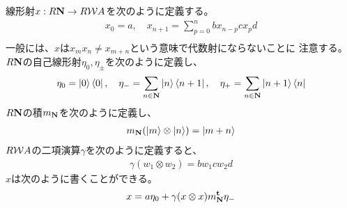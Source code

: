{	\begin{note}[構造その一]\label{note:構造その一} %
		線形射$x:R\mathbf{N}\to R{{\mathcal{W}}} A$を次のように定義する。
		\begin{equation*}\begin{split}
				x_0 = a,\quad x_{n+1} = \sum_{p=0}^n bx_{n-p}cx_pd \\
		\end{split}\end{equation*}
		一般には、$x$は$x_mx_n\neq x_{m+n}$という意味で代数射にならないことに
		注意する。$R\mathbf{N}$の自己線形射$\eta_0,\eta_\pm$を次のように定義し、
		\begin{equation*}\begin{split}
			\eta_0 = \mathinner{|{0}\rangle}\mathinner{\langle{0}|}
			,\quad \eta_- = \sum_{n\in\mathbf{N}}\mathinner{|{n}\rangle}\mathinner{\langle{n+1}|}
			,\quad \eta_+ = \sum_{n\in\mathbf{N}}\mathinner{|{n+1}\rangle}\mathinner{\langle{n}|}
		\end{split}\end{equation*}
		$R\mathbf{N}$の積$m_{\mathbf{N}}$を次のように定義し、
		\begin{equation*}\begin{split}
			m_{\mathbf{N}}(\mathinner{|{m}\rangle}\otimes\mathinner{|{n}\rangle}) = \mathinner{|{m+n}\rangle}
		\end{split}\end{equation*}
		$R{{\mathcal{W}}} A$の二項演算$\gamma$を次のように定義すると、
		\begin{equation*}\begin{split}
			\gamma (w_1\otimes w_2) = bw_1cw_2d
		\end{split}\end{equation*}
		$x$は次のように書くことができる。
		\begin{equation*}\begin{split}
			x = a\eta_0 + \gamma(x\otimes x)m_{\mathbf{N}}^{\mathbf{t}}\eta_-
		\end{split}\end{equation*}
	\end{note} %

}
